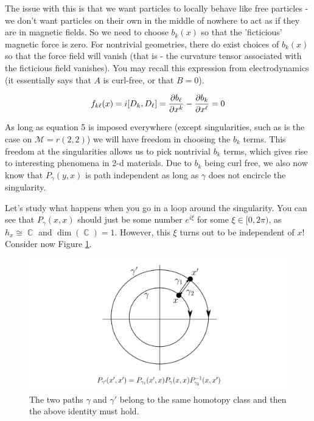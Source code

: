 \documentclass{article}
\DeclareMathOperator{\CC}{\mathbb{C}}
\begin{document}
The issue with this is that we want particles to locally behave like free particles - we don't want particles on their own in the middle of nowhere to act as if they are in magnetic fields. So we need to choose $b_k(x)$ so that the 'ficticious' magnetic force is zero. For nontrivial geometries, there do exist choices of $b_k(x)$ so that the force field will vanish (that is - the curvature tensor associated with the ficticious field vanishes). You may recall this expression from electrodynamics (it essentially says that $A$ is curl-free, or that $B=0$).

\begin{equation}
f_{k\ell}(x) = i[D_k,D_\ell] = \pdv{b_\ell}{x^k} - \pdv{b_k}{x^\ell}=0
\end{equation}

As long as equation 5 is imposed everywhere (except singularities, such as is the case on $\mathcal{M}=r(2,2)$) we will have freedom in choosing the $b_k$ terms. This freedom at the singularities allows us to pick nontrivial $b_k$ terms, which gives rise to interesting phenomena in 2-d materials. Due to $b_k$ being curl free, we also now know that $P_\gamma(y,x)$ is path independent as long as $\gamma$ does not encircle the singularity.

Let's study what happens when you go in a loop around the singularity. You can see that $P_\gamma(x,x)$ should just be some number $e^{i\xi}$ for some $\xi \in [0,2\pi)$, as $h_x \cong \CC$ and $\dim(\CC)=1$. However, this $\xi$ turns out to be independent of $x$! Consider now Figure \ref{fig:31}. 

\begin{figure}[ht]
    \centering
    \includegraphics[width=\linewidth]{Figures/path_independence_gauge.png}
    \captionsetup{belowskip=-15pt}
    \caption{The two paths $ \gamma $ and $ \gamma' $ belong to the same homotopy class and then the above identity must hold.}
    \label{fig:31}
\end{figure}
\end{document}
